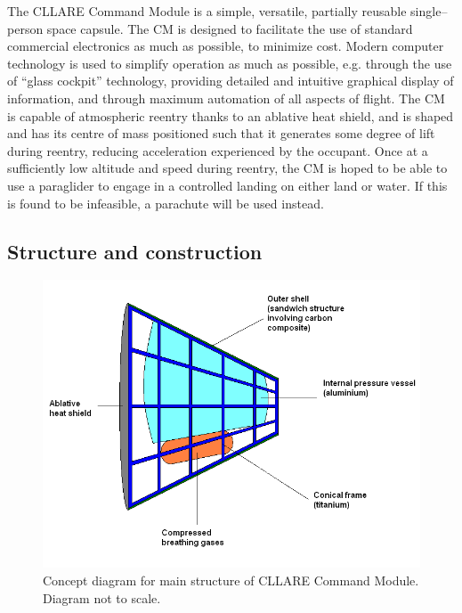 \documentclass{report}
\begin{document}
The CLLARE Command Module is a simple, versatile, partially reusable single--person space capsule.  The CM is designed to facilitate the use of standard commercial electronics as much as possible, to minimize cost.  Modern computer technology is used to simplify operation as much as possible, e.g. through the use of ``glass cockpit'' technology, providing detailed and intuitive graphical display of information, and through maximum automation of all aspects of flight.  The CM is capable of atmospheric reentry thanks to an ablative heat shield, and is shaped and has its centre of mass positioned such that it generates some degree of lift during reentry, reducing acceleration experienced by the occupant.  Once at a sufficiently low altitude and speed during reentry, the CM is hoped to be able to use a paraglider to engage in a controlled landing on either land or water.  If this is found to be infeasible, a parachute will be used instead.

\subsection{Structure and construction}

\begin{figure}[ht] \label{fig:cm_structure}
\centering
\includegraphics[scale=0.6]{images/cllare_cm_structure_concept}
\caption{Concept diagram for main structure of CLLARE Command Module.  Diagram not to scale.}
\end{figure}
\end{document}
